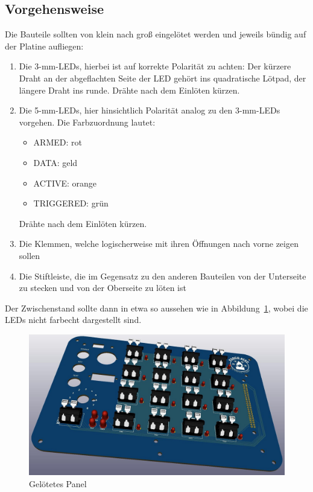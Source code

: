 \documentclass[paper=a4, open=any]{scrbook}
\begin{document}
			\subsection*{Vorgehensweise}
				Die Bauteile sollten von klein nach groß eingelötet werden und jeweils bündig auf der Platine aufliegen:
				\begin{enumerate}
					\item Die 3-mm-LEDs, hierbei ist auf korrekte Polarität zu achten: Der kürzere Draht an der abgeflachten Seite der LED gehört ins quadratische Lötpad, der längere Draht ins runde. Drähte nach dem Einlöten kürzen.
					\item Die 5-mm-LEDs, hier hinsichtlich Polarität analog zu den 3-mm-LEDs vorgehen. Die Farbzuordnung lautet:
					      \begin{itemize}
						      \item ARMED: rot
						      \item DATA: geld
						      \item ACTIVE: orange
						      \item TRIGGERED: grün
					      \end{itemize}
					      Drähte nach dem Einlöten kürzen.
					\item Die Klemmen, welche logischerweise mit ihren Öffnungen nach vorne zeigen sollen
					\item Die Stiftleiste, die im Gegensatz zu den anderen Bauteilen von der Unterseite zu stecken und von der Oberseite zu löten ist
				\end{enumerate}

				Der Zwischenstand sollte dann in etwa so aussehen wie in Abbildung~\ref{fig:panel3d}, wobei die LEDs nicht farbecht dargestellt sind.

				\begin{figure}
					\centering\includegraphics[width=.8\textwidth]{panel3d}
					\caption{Gelötetes Panel}
					\label{fig:panel3d}
				\end{figure}
\end{document}
